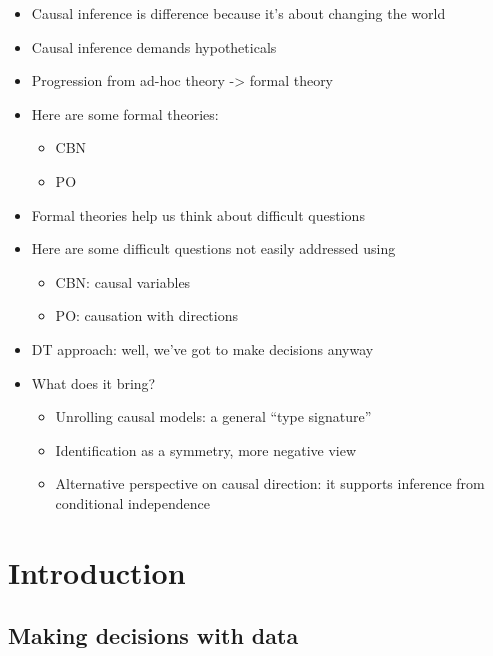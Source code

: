 

\begin{itemize}
    \item Causal inference is difference because it's about changing the world
    \item Causal inference demands hypotheticals
    \item Progression from ad-hoc theory -> formal theory
    \item Here are some formal theories:
    \begin{itemize}
        \item CBN
        \item PO
    \end{itemize}
    \item Formal theories help us think about difficult questions
    \item Here are some difficult questions not easily addressed using
    \begin{itemize}
        \item CBN: causal variables
        \item PO: causation with directions
    \end{itemize}
    \item DT approach: well, we've got to make decisions anyway
    \item What does it bring?
    \begin{itemize}
        \item Unrolling causal models: a general ``type signature''
        \item Identification as a symmetry, more negative view
        \item Alternative perspective on causal direction: it supports inference from conditional independence
    \end{itemize}
\end{itemize}

\chapter{Introduction}\label{ch:introduction}


\section{Making decisions with data}

